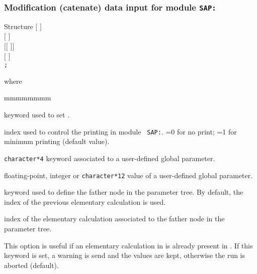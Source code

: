 \subsubsection{Modification (catenate) data input for module {\tt SAP:}}\label{sect:descsap3}

\vskip -0.5cm

\begin{DataStructure}{Structure }
$[$   $]$ \\
$[$   $]$ \\
$[[$   $]]$ \\
$[$  $]$ \\
{\tt ;}
\end{DataStructure}

\noindent where
\begin{ListeDeDescription}{mmmmmmmm}

\item[\moc{EDIT}] keyword used to set .

\item[\dusa{iprint}] index used to control the printing in module {\tt
SAP:}. =0 for no print; =1 for minimum printing (default value).

\item[\dusa{parkey}] {\tt character*4} keyword associated to a user-defined global
parameter.

\item[\dusa{value}] floating-point, integer or {\tt character*12} value of a user-defined
global parameter.

\item[\moc{ORIG}] keyword used to define the father node in the parameter tree. By
default, the index of the previous elementary calculation is used.

\item[\dusa{orig}] index of the elementary calculation associated to the father node in the
parameter tree.

\item[\moc{WARNING-ONLY}] This option is useful if an elementary calculation in  
is already present in . If this keyword is set, a warning is send and the  values
are kept, otherwise the run is aborted (default).

\end{ListeDeDescription}

\clearpage
